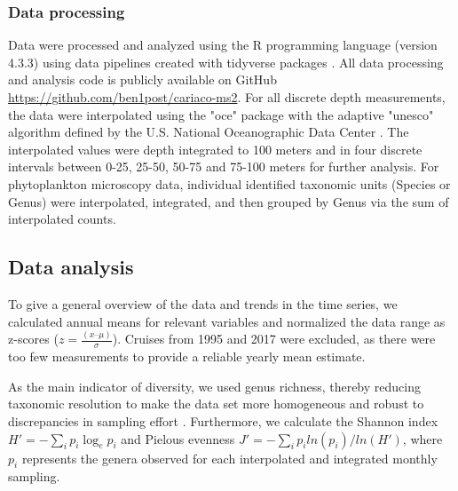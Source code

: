\documentclass[draft]{agujournal2019}
\begin{document}
    \subsubsection{Data processing}
    Data were processed and analyzed using the R programming language (version 4.3.3) \cite{r_core_team_r_2024} using data pipelines created with tidyverse packages \cite{wickham_welcome_2019}. All data processing and analysis code is publicly available on GitHub \url{https://github.com/ben1post/cariaco-ms2}. %
    For all discrete depth measurements, the data were interpolated using the "oce" package \cite{kelley_oce_2023} with the adaptive "unesco" algorithm defined by the U.S. National Oceanographic Data Center \cite{johnson2006world}. The interpolated values were depth integrated to 100 meters and in four discrete intervals between 0-25, 25-50, 50-75 and 75-100 meters for further analysis. For phytoplankton microscopy data, individual identified taxonomic units (Species or Genus) were interpolated, integrated, and then grouped by Genus via the sum of interpolated counts.


\subsection{Data analysis}    
    To give a general overview of the data and trends in the time series, we calculated annual means for relevant variables and normalized the data range as z-scores ($z = \frac{(x – \mu)}{\sigma}$). Cruises from 1995 and 2017 were excluded, as there were too few measurements to provide a reliable yearly mean estimate. 
    
    As the main indicator of diversity, we used genus richness, thereby reducing taxonomic resolution to make the data set more homogeneous and robust to discrepancies in sampling effort \cite{ptacnik_diversity_2008, de2020higher}. Furthermore, we calculate the Shannon index $H' = -\sum_i p_i \log_{e} p_i$ and Pielou\textquotesingle s evenness $J' = -\sum_i p_i ln( p_i )/ln(H')$, where $p_i$ represents the genera observed for each interpolated and integrated monthly sampling. 

      
\end{document}
